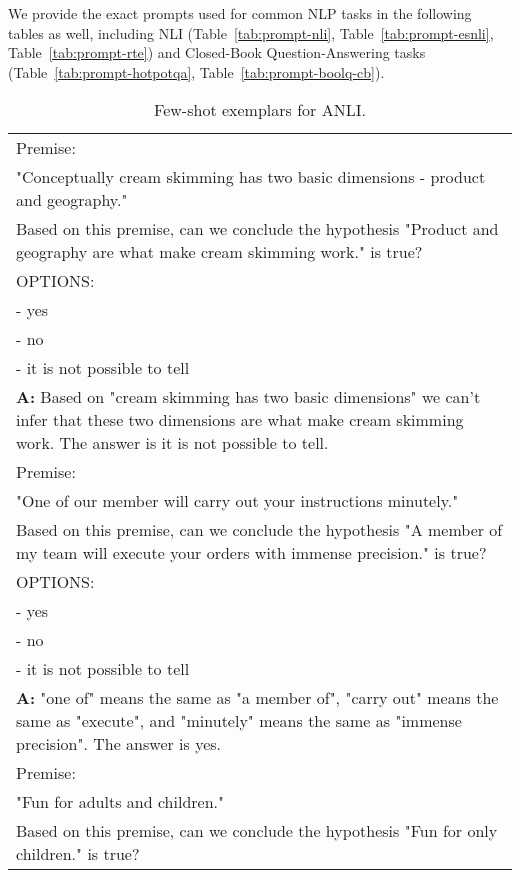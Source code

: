 We provide the exact prompts used for common NLP tasks in the following tables as well, including NLI (Table~\ref{tab:prompt-nli}, Table~\ref{tab:prompt-esnli}, Table~\ref{tab:prompt-rte}) and Closed-Book Question-Answering tasks (Table~\ref{tab:prompt-hotpotqa},  Table~\ref{tab:prompt-boolq-cb}).
\begin{table}[h]
    \caption{
    Few-shot exemplars for ANLI.
    }
    \centering
    \small
    \begin{tabular}{p{14cm}}
        \toprule
        Premise:\\
        "Conceptually cream skimming has two basic dimensions - product and geography."\\
        Based on this premise, can we conclude the hypothesis "Product and geography are what make cream skimming work." is true?\\
        OPTIONS:\\
        - yes\\
        - no\\
        - it is not possible to tell\\
        \vspace{-1mm}
        \textbf{A:} Based on "cream skimming has two basic dimensions" we can't infer that these two dimensions are what make cream skimming work. The answer is it is not possible to tell.\\
        \vspace{0mm}
        Premise:\\
        "One of our member will carry out your instructions minutely."\\
        Based on this premise, can we conclude the hypothesis "A member of my team will execute your orders with immense precision." is true?\\
        OPTIONS:\\
        - yes\\
        - no\\
        - it is not possible to tell\\
        \vspace{-1mm}
        \textbf{A:} "one of" means the same as "a member of", "carry out" means the same as "execute", and "minutely" means the same as "immense precision". The answer is yes.\\
        \vspace{0mm}
        Premise:\\
        "Fun for adults and children."\\
        Based on this premise, can we conclude the hypothesis "Fun for only children." is true?\\

\end{tabular}
\end{table}
